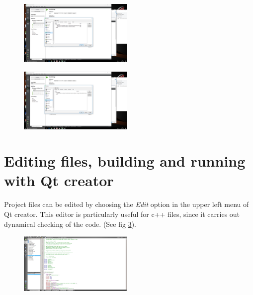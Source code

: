 \documentclass[a4paper,10pt]{article}
\begin{document}
\begin{minipage}{0.5\linewidth}
\begin{figure}[H]
\begin{center}
\includegraphics[width=5.5cm]{fig19.png}
\vspace*{-1mm}
\caption{\small  \label{fig:19}}
\end{center}
\end{figure}
\end{minipage}
\begin{minipage}{0.5\linewidth}
\begin{figure}[H]
\begin{center}
\includegraphics[width=5.5cm]{fig20.png}
\vspace*{-1mm}
\caption{\small  \label{fig:20}}
\end{center}
\end{figure}
\end{minipage}

\section{Editing files, building and running with Qt creator}

Project files can be edited by choosing the {\it Edit} option in the upper left menu of Qt creator.
This editor is particularly useful for c++ files, since it carries out dynamical checking of the code.
(See fig \ref{fig:21}).

\begin{figure}[H]
\begin{center}
\includegraphics[width=5.5cm]{fig21.png}
\vspace*{-1mm}
\caption{\small  \label{fig:21}}
\end{center}
\end{figure}
\end{document}
